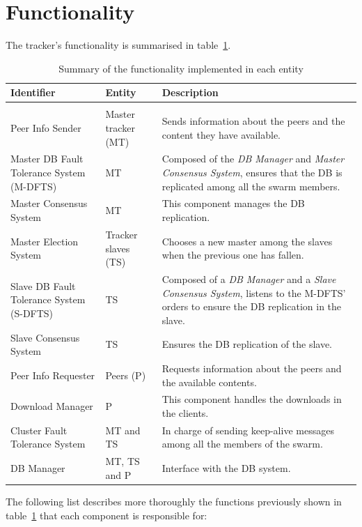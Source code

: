 \documentclass[twoside,a4paper,10pt]{article}
\begin{document}
\section{Functionality}

The tracker's functionality is summarised in table~\ref{tab:fun-entities}.

\begin{table}
  \centering
  \begin{tabularx}{\linewidth}{l l X}
    Identifier & Entity & Description \\ \hline\hline \\
    Peer Info Sender & Master tracker (MT) & Sends information about the peers and
    the content they have available. \\
    Master DB Fault Tolerance System (M-DFTS) & MT & Composed of the
    \emph{DB Manager} and \emph{Master Consensus System}, ensures that the
    DB is replicated among all the swarm members.\\
    Master Consensus System & MT & This component manages the DB
    replication.\\
    Master Election System & Tracker slaves (TS) & Chooses a new master among the
    slaves when the previous one has fallen.\\
    Slave DB Fault Tolerance System (S-DFTS) & TS & Composed of a
    \emph{DB Manager} and a \emph{Slave Consensus System}, listens to the
    M-DFTS' orders to ensure the DB replication in the slave.\\
    Slave Consensus System & TS &  Ensures the DB replication of
    the slave.\\
    Peer Info Requester & Peers (P) & Requests information about the peers and the
    available contents.\\
    Download Manager & P & This component handles the downloads in the
    clients.\\
    Cluster Fault Tolerance System & MT and TS &
    In charge of sending keep-alive messages among all the members of the
    swarm.\\
    DB Manager & MT, TS and P & Interface with the
    DB system.\\
  \end{tabularx}
  \caption{\label{tab:fun-entities}Summary of the functionality
    implemented in each entity}
\end{table}

The following list describes more thoroughly the functions previously shown in
table~\ref{tab:fun-entities} that each component is responsible for:
\end{document}
